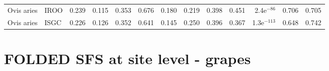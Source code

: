 \begin{longtable}{llrrrrrrrrrrr}
          Ovis aries &                      IROO &                              0.239 &                               0.115 &                 0.353 &                 0.676 &                              0.180 &                               0.219 &                 0.398 &                 0.451 &  2.4e$^{-86}$ &  0.706 &  0.705 \\
          Ovis aries &                      ISGC &                              0.226 &                               0.126 &                 0.352 &                 0.641 &                              0.145 &                               0.250 &                 0.396 &                 0.367 & 1.3e$^{-113}$ &  0.648 &  0.742 \\
\end{longtable}
\newpage\section*{FOLDED SFS at site level - grapes} 
